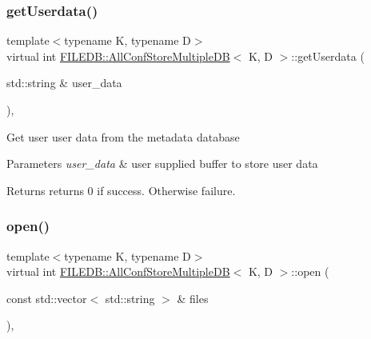 \subsubsection{\texorpdfstring{getUserdata()}{getUserdata()}\hspace{0.1cm}{\footnotesize\ttfamily [3/3]}}
{\footnotesize\ttfamily template$<$typename K, typename D$>$ \\
virtual int \mbox{\hyperlink{classFILEDB_1_1AllConfStoreMultipleDB}{F\+I\+L\+E\+D\+B\+::\+All\+Conf\+Store\+Multiple\+DB}}$<$ K, D $>$\+::get\+Userdata (\begin{DoxyParamCaption}\item[{std\+::string \&}]{user\+\_\+data }\end{DoxyParamCaption})\hspace{0.3cm}{\ttfamily [inline]}, {\ttfamily [virtual]}}

Get user user data from the metadata database


\begin{DoxyParams}{Parameters}
{\em user\+\_\+data} & user supplied buffer to store user data \\
\hline
\end{DoxyParams}
\begin{DoxyReturn}{Returns}
returns 0 if success. Otherwise failure. 
\end{DoxyReturn}
\mbox{\label{classFILEDB_1_1AllConfStoreMultipleDB_aa006283e8d6f0f079ca234c369f53679}} 
\subsubsection{\texorpdfstring{open()}{open()}\hspace{0.1cm}{\footnotesize\ttfamily [1/3]}}
{\footnotesize\ttfamily template$<$typename K, typename D$>$ \\
virtual int \mbox{\hyperlink{classFILEDB_1_1AllConfStoreMultipleDB}{F\+I\+L\+E\+D\+B\+::\+All\+Conf\+Store\+Multiple\+DB}}$<$ K, D $>$\+::open (\begin{DoxyParamCaption}\item[{const std\+::vector$<$ std\+::string $>$ \&}]{files }\end{DoxyParamCaption})\hspace{0.3cm}{\ttfamily [inline]}, {\ttfamily [virtual]}}

